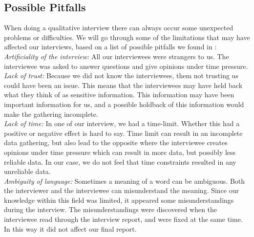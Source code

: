 \subsection{Possible Pitfalls}
When doing a qualitative interview there can always occur some unexpected problems or difficulties. We will go through some of the limitations that may have affected our interviews, based on a list of possible pitfalls we found in \cite{interview}:\\
\emph{Artificiality of the interview:} All our interviewees were strangers to us. The interviewee was asked to answer questions  and give opinions under time pressure.\\
\emph{Lack of trust:} Because we did not know the interviewees, them not trusting us could have been an issue. This means that the interviewees may have held back what they think of as sensitive information. This information may have been important information for us, and a possible holdback of this information would make the gathering incomplete. \\
\emph{Lack of time:} In one of our interview, we had a time-limit. Whether this had a positive or negative effect is hard to say. Time limit can result in an incomplete data gathering, but also lead to the opposite where the interviewee creates opinions under time pressure which can result in more data, but possibly less reliable data. In our case, we do not feel that time constraints resulted in any unreliable data. \\
\emph{Ambiguity of language:} Sometimes a meaning of a word can be ambiguous. Both the interviewer and the interviewee can misunderstand the meaning. Since our knowledge within this field was limited, it appeared some misunderstandings during the interview. The misunderstandings were discovered when the interviewee read through the interview report, and were fixed at the same time. In this way it did not affect our final report.  

